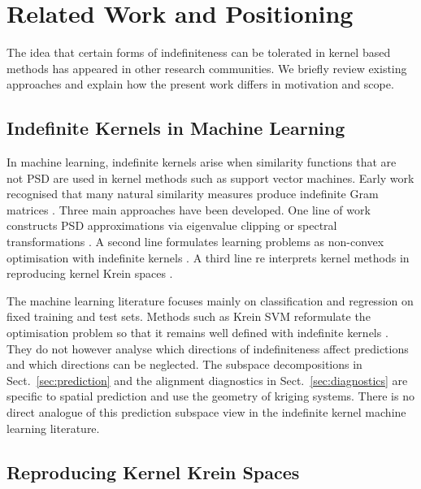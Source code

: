 \documentclass[smallextended]{svjour3}
\newcommand{\1}{\mathbf{1}}
\begin{document}
\section{Related Work and Positioning}
\label{sec:literature}

The idea that certain forms of indefiniteness can be tolerated in kernel based methods has appeared in other research communities. We briefly review existing approaches and explain how the present work differs in motivation and scope.

\subsection{Indefinite Kernels in Machine Learning}

In machine learning, indefinite kernels arise when similarity functions that are not PSD are used in kernel methods such as support vector machines. Early work recognised that many natural similarity measures produce indefinite Gram matrices \citep{haasdonk2005feature,haasdonk2005learning}. Three main approaches have been developed. One line of work constructs PSD approximations via eigenvalue clipping or spectral transformations \citep{Chen2009,Alabdulmohsin2014}. A second line formulates learning problems as non-convex optimisation with indefinite kernels \citep{Luss2009}. A third line re interprets kernel methods in reproducing kernel Krein spaces \citep{Schwartz1964}.

The machine learning literature focuses mainly on classification and regression on fixed training and test sets. Methods such as Krein SVM reformulate the optimisation problem so that it remains well defined with indefinite kernels \citep{haasdonk2005feature,haasdonk2005learning}. They do not however analyse which directions of indefiniteness affect predictions and which directions can be neglected. The subspace decompositions in Sect.~\ref{sec:prediction} and the alignment diagnostics in Sect.~\ref{sec:diagnostics}   are specific to spatial prediction and use the geometry of kriging systems. There is no direct analogue of this prediction subspace view in the indefinite kernel machine learning literature.

\subsection{Reproducing Kernel Krein Spaces}
\end{document}
